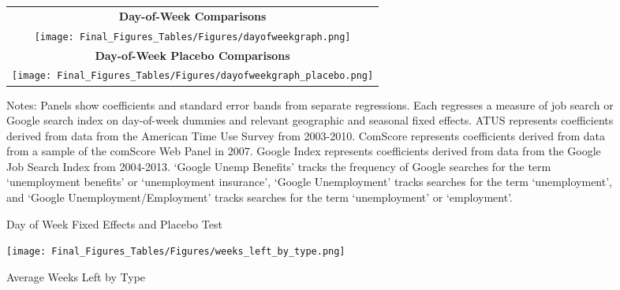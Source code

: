 \documentclass[12pt]{article}
\begin{document}
\begin{spacing}{2}
\begin{figure}[!ht]
\centering
\caption{Day of Week Fixed Effects and Placebo Test} \label{fig:dayofweek}
	\begin{tabular}{c}
	\textbf{Day-of-Week Comparisons}\\
\texttt{[image: Final\_Figures\_Tables/Figures/dayofweekgraph.png]}\\
	\textbf{Day-of-Week Placebo Comparisons}\\
\texttt{[image: Final\_Figures\_Tables/Figures/dayofweekgraph\_placebo.png]}
\end{tabular}
	\vspace{.5mm}
	\hspace{.45in}
	\begin{tablenotes}
\item Notes: Panels show coefficients and standard error bands from separate regressions. Each regresses a measure of job search or Google search index on day-of-week dummies and relevant geographic and seasonal fixed effects. ATUS represents coefficients derived from data from the American Time Use Survey from 2003-2010. ComScore represents coefficients derived from data from a sample of the comScore Web Panel in 2007. Google Index represents coefficients derived from data from the Google Job Search Index from 2004-2013. `Google Unemp Benefits' tracks the frequency of Google searches for the term `unemployment benefits' or `unemployment insurance', `Google Unemployment' tracks searches for the term `unemployment', and `Google Unemployment/Employment' tracks searches for the term `unemployment' or `employment'.
\end{tablenotes}
\end{figure}


\newpage
\clearpage

\begin{figure}
  \begin{center}
    \texttt{[image: Final\_Figures\_Tables/Figures/weeks\_left\_by\_type.png]}
  \caption{Average Weeks Left by Type}
  \label{fig:avgweeksleft}
  \end{center}
\end{figure}


\end{spacing}
\end{document}
